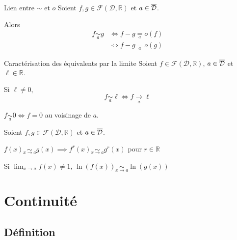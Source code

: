     \begin{theo}{Lien entre $\sim$ et $o$}{}
        Soient $f,g \in \mathcal{F}(\mathcal{D},\mathbb{R})$ et $a \in \overline{\mathcal{D}}$.

        Alors
        \begin{align*}
            f \underset{a}{\sim} g &\iff f-g \underset{a}{=} o(f) \\
            &\iff f-g \underset{a}{=} o(g)
        \end{align*}
    \end{theo}

    \begin{prop}{Caractérisation des équivalents par la limite}{}
        Soient $f \in \mathcal{F}(\mathcal{D},\mathbb{R})$, $a \in \overline{\mathcal{D}}$ et $\ell \in \mathbb{R}$.

        \begin{alors}
            \item Si $\ell \neq 0$, 
            \[ f \underset{a}{\sim} \ell \iff f \underset{a}{\longrightarrow} \ell \]
            \item $f \underset{a}{\sim} 0 \iff f=0$ au voisinage de $a$.
        \end{alors}
    \end{prop}

    \begin{prop}{}{}
        Soient $f,g \in \mathcal{F}(\mathcal{D},\mathbb{R})$ et $a \in \overline{\mathcal{D}}$.
    
        \begin{alors}
            \item $ f(x) \underset{x \rightarrow a}{\sim} g(x) \implies f^r(x) \underset{x \rightarrow a}{\sim} g^r(x) $  pour $r \in \mathbb{R}$
            \item Si $\lim_{x \to a} f(x) \neq 1$, $\ln(f(x)) \underset{x \rightarrow a}{\sim} \ln(g(x))$
        \end{alors}
    \end{prop}

\section{Continuité}

\subsection{Définition}

